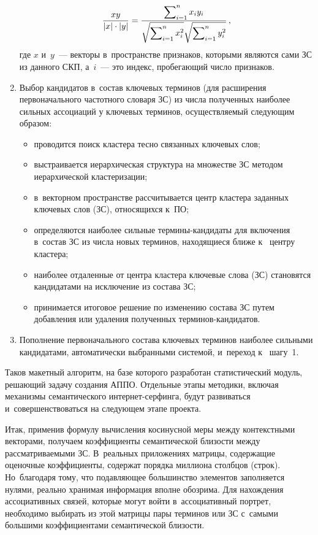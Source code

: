 \begin{multicols}{2}
\begin{enumerate}[1.]
\noindent
     $$
     \displaystyle\frac{\displaystyle x y\mathstrut}{\displaystyle \vert x\vert \cdot\vert y \vert\mathstrut} = \displaystyle\frac{\displaystyle \sum\nolimits_{i=1}^n x_i
y_i\mathstrut}{\displaystyle  \sqrt{\sum\nolimits_{i=1}^n x_i^2} \sqrt{\sum\nolimits_{i=1}^n y_i^2}\mathstrut}\,,
     $$
где $x$ и~$y$~--- векторы в~пространстве признаков, которыми являются
сами ЗС из данного СКП, а~$i$~--- это индекс, пробегающий число признаков.
     \item Выбор кандидатов в~состав ключевых терминов (для расширения
первоначального частотного словаря ЗС) из числа полученных наиболее
сильных ассоциаций у ключевых терминов, осуществляемый следующим
образом:
     \begin{itemize}
\item проводится поиск кластера тесно связанных ключевых слов;
\item выстраивается иерархическая структура на множестве ЗС методом
иерархической клас\-те\-ри\-зации;
\item в~векторном пространстве рассчитывается центр кластера заданных
ключевых слов (ЗС), относящихся к~ПО;
\item определяются наиболее сильные тер\-ми\-ны-кан\-ди\-да\-ты для включения в~состав ЗС из числа новых терминов, находящиеся ближе к~ центру кластера;
\item наиболее отдаленные от центра кластера ключевые слова (ЗС)
становятся кандидатами на исключение из состава ЗС;
\item принимается итоговое решение по изменению состава ЗС путем
добавления или удаления полученных тер\-ми\-нов-кан\-ди\-датов.
\end{itemize}
     \item Пополнение первоначального состава ключевых терминов
наиболее сильными кандидатами, автоматически выбранными системой, и~переход к~ шагу~1.
     \end{enumerate}

     Таков макетный алгоритм, на базе которого разработан статистический
модуль, решающий задачу создания АППО. Отдельные этапы методики,
включая механизмы семантического ин\-тер\-нет-сер\-фин\-га, будут
развиваться и~совершенствоваться на следующем этапе проекта.


     Итак, применив формулу вычисления косинусной меры между
контекстными векторами, получаем коэффициенты семантической близости
\mbox{между} рассматриваемыми ЗС. В~реальных приложениях матрицы,
содержащие оценочные коэффициенты, содержат порядка миллиона
столбцов (строк). Но~благодаря тому, что подавляющее большинство
элементов заполняется нулями, реально хранимая информация вполне
обозрима. Для нахождения ассоциативных связей, которые могут войти в~ассоциативный портрет, необходимо выбирать из этой матрицы пары
терминов или ЗС с~самыми большими коэффициентами семантической
близости.


\end{multicols}
